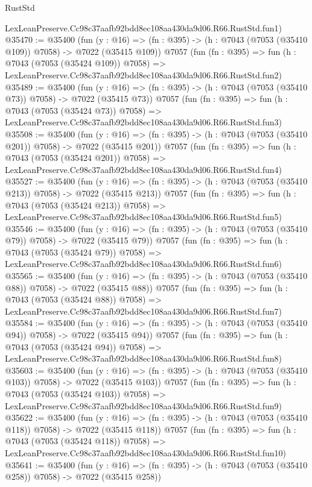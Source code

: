 \begin{lexlean}{RustStd}
\begin{coremodule}
    LexLeanPreserve.Cc98c37aafb92bdd8ec108aa430da9d06.R66.RustStd.fun1)
@35470 := @35400
    (fun (y : @16) => (fn : @395) -> (h : @7043 (@7053 (@35410 @109)) @7058) -> @7022 (@35415 @109))
    @7057
    (fun (fn : @395) =>
    fun (h : @7043 (@7053 (@35424 @109)) @7058) =>
    LexLeanPreserve.Cc98c37aafb92bdd8ec108aa430da9d06.R66.RustStd.fun2)
@35489 := @35400
    (fun (y : @16) => (fn : @395) -> (h : @7043 (@7053 (@35410 @73)) @7058) -> @7022 (@35415 @73))
    @7057
    (fun (fn : @395) =>
    fun (h : @7043 (@7053 (@35424 @73)) @7058) =>
    LexLeanPreserve.Cc98c37aafb92bdd8ec108aa430da9d06.R66.RustStd.fun3)
@35508 := @35400
    (fun (y : @16) => (fn : @395) -> (h : @7043 (@7053 (@35410 @201)) @7058) -> @7022 (@35415 @201))
    @7057
    (fun (fn : @395) =>
    fun (h : @7043 (@7053 (@35424 @201)) @7058) =>
    LexLeanPreserve.Cc98c37aafb92bdd8ec108aa430da9d06.R66.RustStd.fun4)
@35527 := @35400
    (fun (y : @16) => (fn : @395) -> (h : @7043 (@7053 (@35410 @213)) @7058) -> @7022 (@35415 @213))
    @7057
    (fun (fn : @395) =>
    fun (h : @7043 (@7053 (@35424 @213)) @7058) =>
    LexLeanPreserve.Cc98c37aafb92bdd8ec108aa430da9d06.R66.RustStd.fun5)
@35546 := @35400
    (fun (y : @16) => (fn : @395) -> (h : @7043 (@7053 (@35410 @79)) @7058) -> @7022 (@35415 @79))
    @7057
    (fun (fn : @395) =>
    fun (h : @7043 (@7053 (@35424 @79)) @7058) =>
    LexLeanPreserve.Cc98c37aafb92bdd8ec108aa430da9d06.R66.RustStd.fun6)
@35565 := @35400
    (fun (y : @16) => (fn : @395) -> (h : @7043 (@7053 (@35410 @88)) @7058) -> @7022 (@35415 @88))
    @7057
    (fun (fn : @395) =>
    fun (h : @7043 (@7053 (@35424 @88)) @7058) =>
    LexLeanPreserve.Cc98c37aafb92bdd8ec108aa430da9d06.R66.RustStd.fun7)
@35584 := @35400
    (fun (y : @16) => (fn : @395) -> (h : @7043 (@7053 (@35410 @94)) @7058) -> @7022 (@35415 @94))
    @7057
    (fun (fn : @395) =>
    fun (h : @7043 (@7053 (@35424 @94)) @7058) =>
    LexLeanPreserve.Cc98c37aafb92bdd8ec108aa430da9d06.R66.RustStd.fun8)
@35603 := @35400
    (fun (y : @16) => (fn : @395) -> (h : @7043 (@7053 (@35410 @103)) @7058) -> @7022 (@35415 @103))
    @7057
    (fun (fn : @395) =>
    fun (h : @7043 (@7053 (@35424 @103)) @7058) =>
    LexLeanPreserve.Cc98c37aafb92bdd8ec108aa430da9d06.R66.RustStd.fun9)
@35622 := @35400
    (fun (y : @16) => (fn : @395) -> (h : @7043 (@7053 (@35410 @118)) @7058) -> @7022 (@35415 @118))
    @7057
    (fun (fn : @395) =>
    fun (h : @7043 (@7053 (@35424 @118)) @7058) =>
    LexLeanPreserve.Cc98c37aafb92bdd8ec108aa430da9d06.R66.RustStd.fun10)
@35641 := @35400
    (fun (y : @16) => (fn : @395) -> (h : @7043 (@7053 (@35410 @258)) @7058) -> @7022 (@35415 @258))

\end{coremodule}
\end{lexlean}
